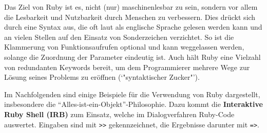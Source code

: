 Das Ziel von Ruby ist es, nicht (nur) maschinenlesbar zu sein, sondern vor allem die Lesbarkeit und Nutzbarkeit durch Menschen zu verbessern. Dies drückt sich durch eine Syntax aus, die oft laut als englische Sprache gelesen werden kann und an vielen Stellen auf den Einsatz von Sonderzeichen verzichtet. So ist die Klammerung von Funktionsaufrufen optional und kann weggelassen werden, solange die Zuordnung der Parameter eindeutig ist. Auch hält Ruby eine Vielzahl von redundanten Keywords bereit, um dem Programmierer mehrere Wege zur Lösung seines Problems zu eröffnen (`"syntaktischer Zucker"').

\setlength{\epigraphwidth}{\marginparwidth}
\setlength{\epigraphwidth}{0.8\textwidth}

Im Nachfolgenden sind einige Beispiele für die Verwendung von Ruby dargestellt, insbesondere die "`Alles-ist-ein-Objekt"'-Philosophie. Dazu kommt die \textbf{Interaktive Ruby Shell (IRB)} zum Einsatz, welche im Dialogverfahren Ruby-Code auswertet. Eingaben sind mit \verb+>>+ gekennzeichnet, die Ergebnisse darunter mit \texttt{=>}.

 \begin{ruby}[label=Interaktive Ruby Sitzung (IRB)]
    
      
    
     
 \end{ruby}

